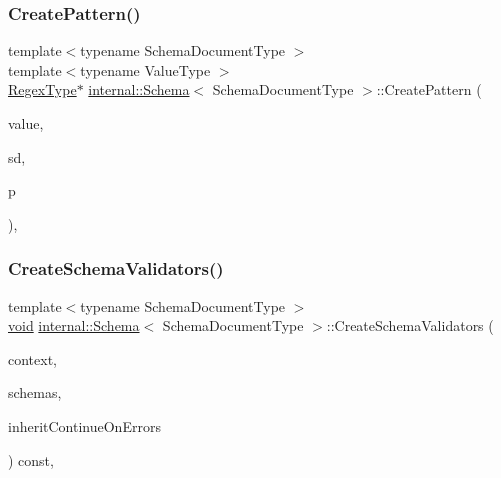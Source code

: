 \subsubsection{\texorpdfstring{Create\+Pattern()}{CreatePattern()}}
{\footnotesize\ttfamily template$<$typename Schema\+Document\+Type $>$ \\
template$<$typename Value\+Type $>$ \\
\hyperlink{classinternal_1_1Schema_a78fd42fda3cecdad0ee56559b4e3cec6}{Regex\+Type}$\ast$ \hyperlink{classinternal_1_1Schema}{internal\+::\+Schema}$<$ Schema\+Document\+Type $>$\+::Create\+Pattern (\begin{DoxyParamCaption}\item[{const \hyperlink{classinternal_1_1Schema_a8976b6d7e2a885483d0b51d941019340}{Value\+Type} \&}]{value,  }\item[{Schema\+Document\+Type $\ast$}]{sd,  }\item[{const \hyperlink{classinternal_1_1Schema_a13d7dbba6e4a77b10862546777c5aae8}{Pointer\+Type} \&}]{p }\end{DoxyParamCaption})\hspace{0.3cm}{\ttfamily [inline]}, {\ttfamily [private]}}

\mbox{\label{classinternal_1_1Schema_ab63ccbc0129a562788f6263580003965}} 
\subsubsection{\texorpdfstring{Create\+Schema\+Validators()}{CreateSchemaValidators()}}
{\footnotesize\ttfamily template$<$typename Schema\+Document\+Type $>$ \\
\hyperlink{imgui__impl__opengl3__loader_8h_ac668e7cffd9e2e9cfee428b9b2f34fa7}{void} \hyperlink{classinternal_1_1Schema}{internal\+::\+Schema}$<$ Schema\+Document\+Type $>$\+::Create\+Schema\+Validators (\begin{DoxyParamCaption}\item[{\hyperlink{classinternal_1_1Schema_ac3f54abfefe300c5610c1205869cfd66}{Context} \&}]{context,  }\item[{const \hyperlink{structinternal_1_1Schema_1_1SchemaArray}{Schema\+Array} \&}]{schemas,  }\item[{const bool}]{inherit\+Continue\+On\+Errors }\end{DoxyParamCaption}) const\hspace{0.3cm}{\ttfamily [inline]}, {\ttfamily [private]}}

